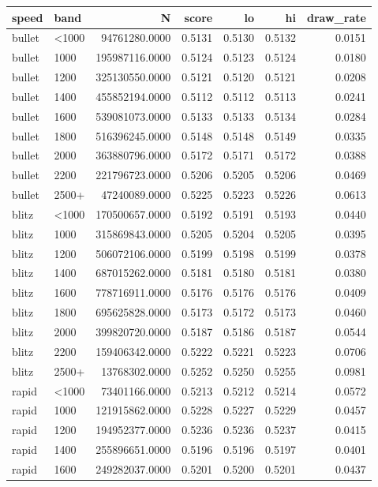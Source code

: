 \begin{tabular}{llrrrrr}
\toprule
speed & band & N & score & lo & hi & draw_rate \\
\midrule
bullet & <1000 & 94761280.0000 & 0.5131 & 0.5130 & 0.5132 & 0.0151 \\
bullet & 1000 & 195987116.0000 & 0.5124 & 0.5123 & 0.5124 & 0.0180 \\
bullet & 1200 & 325130550.0000 & 0.5121 & 0.5120 & 0.5121 & 0.0208 \\
bullet & 1400 & 455852194.0000 & 0.5112 & 0.5112 & 0.5113 & 0.0241 \\
bullet & 1600 & 539081073.0000 & 0.5133 & 0.5133 & 0.5134 & 0.0284 \\
bullet & 1800 & 516396245.0000 & 0.5148 & 0.5148 & 0.5149 & 0.0335 \\
bullet & 2000 & 363880796.0000 & 0.5172 & 0.5171 & 0.5172 & 0.0388 \\
bullet & 2200 & 221796723.0000 & 0.5206 & 0.5205 & 0.5206 & 0.0469 \\
bullet & 2500+ & 47240089.0000 & 0.5225 & 0.5223 & 0.5226 & 0.0613 \\
blitz & <1000 & 170500657.0000 & 0.5192 & 0.5191 & 0.5193 & 0.0440 \\
blitz & 1000 & 315869843.0000 & 0.5205 & 0.5204 & 0.5205 & 0.0395 \\
blitz & 1200 & 506072106.0000 & 0.5199 & 0.5198 & 0.5199 & 0.0378 \\
blitz & 1400 & 687015262.0000 & 0.5181 & 0.5180 & 0.5181 & 0.0380 \\
blitz & 1600 & 778716911.0000 & 0.5176 & 0.5176 & 0.5176 & 0.0409 \\
blitz & 1800 & 695625828.0000 & 0.5173 & 0.5172 & 0.5173 & 0.0460 \\
blitz & 2000 & 399820720.0000 & 0.5187 & 0.5186 & 0.5187 & 0.0544 \\
blitz & 2200 & 159406342.0000 & 0.5222 & 0.5221 & 0.5223 & 0.0706 \\
blitz & 2500+ & 13768302.0000 & 0.5252 & 0.5250 & 0.5255 & 0.0981 \\
rapid & <1000 & 73401166.0000 & 0.5213 & 0.5212 & 0.5214 & 0.0572 \\
rapid & 1000 & 121915862.0000 & 0.5228 & 0.5227 & 0.5229 & 0.0457 \\
rapid & 1200 & 194952377.0000 & 0.5236 & 0.5236 & 0.5237 & 0.0415 \\
rapid & 1400 & 255896651.0000 & 0.5196 & 0.5196 & 0.5197 & 0.0401 \\
rapid & 1600 & 249282037.0000 & 0.5201 & 0.5200 & 0.5201 & 0.0437 \\

\end{tabular}
